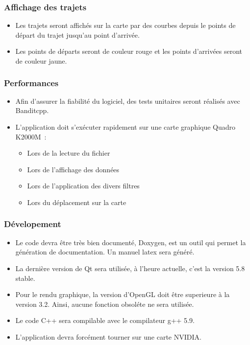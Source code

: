 \documentclass[12pt]{article}
\begin{document}
			\subsubsection{Affichage des trajets}
				\begin{itemize}
					\item Les trajets seront affichés sur la carte par des courbes depuis le points de départ du trajet jusqu'au point d'arrivée.
					\item Les points de départs seront de couleur rouge et les points d'arrivées seront de couleur jaune.
				\end{itemize}


			\subsubsection{Performances}
				\begin{itemize}
					\item Afin d'assurer la fiabilité du logiciel, des tests unitaires seront réalisés avec Banditcpp. 
					\item L'application doit s’exécuter rapidement sur une carte graphique Quadro K2000M :
					\begin{itemize}
						\item Lors de la lecture du fichier
						\item Lors de l'affichage des données
						\item Lors de l'application des divers filtres
						\item Lors du déplacement sur la carte
					\end{itemize}
				\end{itemize}

			\subsubsection{Dévelopement}
				\begin{itemize}
					\item Le code devra être très bien documenté, Doxygen, est un outil qui permet la génération de documentation. Un manuel latex sera généré.
					\item La dernière version de Qt sera utilisée, à l'heure actuelle, c'est la version 5.8 stable.
					\item Pour le rendu graphique, la version d'OpenGL doit être superieure à la version 3.2. Ainsi, aucune fonction obsoléte ne sera utilisée.
					\item Le code C++ sera compilable avec le compilateur g++ 5.9.
					\item L'application devra forcément tourner sur une carte NVIDIA.
				\end{itemize}
	\newpage
\end{document}
